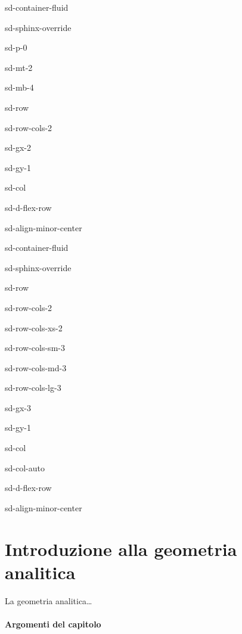 \documentclass[letterpaper,10pt,italian]{jupyterBook}
\begin{document}
\begin{sphinxuseclass}{sd-container-fluid}
\begin{sphinxuseclass}{sd-sphinx-override}
\begin{sphinxuseclass}{sd-p-0}
\begin{sphinxuseclass}{sd-mt-2}
\begin{sphinxuseclass}{sd-mb-4}
\begin{sphinxuseclass}{sd-row}
\begin{sphinxuseclass}{sd-row-cols-2}
\begin{sphinxuseclass}{sd-gx-2}
\begin{sphinxuseclass}{sd-gy-1}
\begin{sphinxuseclass}{sd-col}
\begin{sphinxuseclass}{sd-d-flex-row}
\begin{sphinxuseclass}{sd-align-minor-center}
\begin{sphinxuseclass}{sd-container-fluid}
\begin{sphinxuseclass}{sd-sphinx-override}
\begin{sphinxuseclass}{sd-row}
\begin{sphinxuseclass}{sd-row-cols-2}
\begin{sphinxuseclass}{sd-row-cols-xs-2}
\begin{sphinxuseclass}{sd-row-cols-sm-3}
\begin{sphinxuseclass}{sd-row-cols-md-3}
\begin{sphinxuseclass}{sd-row-cols-lg-3}
\begin{sphinxuseclass}{sd-gx-3}
\begin{sphinxuseclass}{sd-gy-1}
\begin{sphinxuseclass}{sd-col}
\begin{sphinxuseclass}{sd-col-auto}
\begin{sphinxuseclass}{sd-d-flex-row}
\begin{sphinxuseclass}{sd-align-minor-center}
\end{sphinxuseclass}
\end{sphinxuseclass}
\end{sphinxuseclass}
\end{sphinxuseclass}
\end{sphinxuseclass}
\end{sphinxuseclass}
\end{sphinxuseclass}
\end{sphinxuseclass}
\end{sphinxuseclass}
\end{sphinxuseclass}
\end{sphinxuseclass}
\end{sphinxuseclass}
\end{sphinxuseclass}
\end{sphinxuseclass}
\end{sphinxuseclass}
\end{sphinxuseclass}
\end{sphinxuseclass}
\end{sphinxuseclass}
\end{sphinxuseclass}
\end{sphinxuseclass}
\end{sphinxuseclass}
\end{sphinxuseclass}
\end{sphinxuseclass}
\end{sphinxuseclass}
\end{sphinxuseclass}
\end{sphinxuseclass}

\chapter{Introduzione alla geometria analitica}
\label{\detokenize{ch/analytic_geometry:introduzione-alla-geometria-analitica}}\label{\detokenize{ch/analytic_geometry:geometry-analytic}}\label{\detokenize{ch/analytic_geometry::doc}}
\sphinxAtStartPar
La geometria analitica…
\subsubsection*{Argomenti del capitolo}
\end{document}
